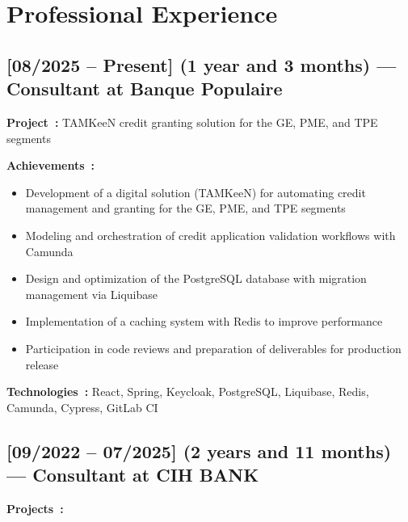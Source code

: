 \section*{Professional Experience}

\subsection*{[08/2025 -- Present] (1 year and 3 months) --- Consultant at Banque Populaire}
\vspace{4pt}
\textbf{Project~:} TAMKeeN credit granting solution for the GE, PME, and TPE segments

\textbf{Achievements~:}
\begin{itemize}
    \item Development of a digital solution (TAMKeeN) for automating credit management and granting for the GE, PME, and TPE segments
    \item Modeling and orchestration of credit application validation workflows with Camunda
    \item Design and optimization of the PostgreSQL database with migration management via Liquibase
    \item Implementation of a caching system with Redis to improve performance
    \item Participation in code reviews and preparation of deliverables for production release
\end{itemize}
\textbf{Technologies~:} React, Spring, Keycloak, PostgreSQL, Liquibase, Redis, Camunda, Cypress, GitLab CI

\subsection*{[09/2022 -- 07/2025] (2 years and 11 months) --- Consultant at CIH BANK}
\textbf{Projects~:}

